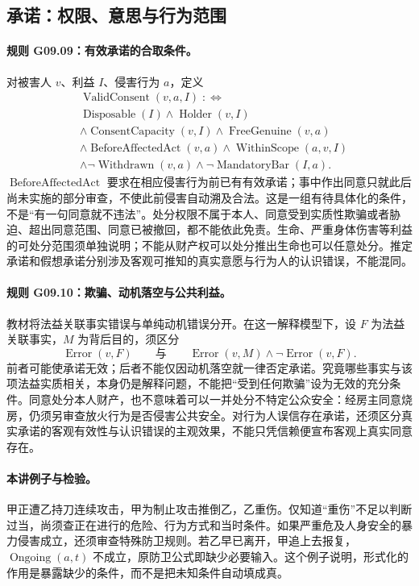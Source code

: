 \subsection{承诺：权限、意思与行为范围}
\paragraph{规则 G09.09：有效承诺的合取条件。}
对被害人 $v$、利益 $I$、侵害行为 $a$，定义
\[
\begin{aligned}
&\operatorname{ValidConsent}(v,a,I)\;:\!\!\iff\\
&\operatorname{Disposable}(I)\land\operatorname{Holder}(v,I)\\
&\land\operatorname{ConsentCapacity}(v,I)
\land\operatorname{FreeGenuine}(v,a)\\
&\land\operatorname{BeforeAffectedAct}(v,a)
\land\operatorname{WithinScope}(a,v,I)\\
&\land\neg\operatorname{Withdrawn}(v,a)
\land\neg\operatorname{MandatoryBar}(I,a).
\end{aligned}
\]
$\operatorname{BeforeAffectedAct}$ 要求在相应侵害行为前已有有效承诺；事中作出同意只就此后尚未实施的部分审查，不使此前侵害自动溯及合法。这是一组有待具体化的条件，不是“有一句同意就不违法”。处分权限不属于本人、同意受到实质性欺骗或者胁迫、超出同意范围、同意已被撤回，都不能依此免责。生命、严重身体伤害等利益的可处分范围须单独说明；不能从财产权可以处分推出生命也可以任意处分。推定承诺和假想承诺分别涉及客观可推知的真实意愿与行为人的认识错误，不能混同。

\paragraph{规则 G09.10：欺骗、动机落空与公共利益。}
教材将法益关联事实错误与单纯动机错误分开。在这一解释模型下，设 $F$ 为法益关联事实，$M$ 为背后目的，须区分
\[
\operatorname{Error}(v,F)\qquad\text{与}\qquad
\operatorname{Error}(v,M)\land\neg\operatorname{Error}(v,F).
\]
前者可能使承诺无效；后者不能仅因动机落空就一律否定承诺。究竟哪些事实与该项法益实质相关，本身仍是解释问题，不能把“受到任何欺骗”设为无效的充分条件。同意处分本人财产，也不意味着可以一并处分不特定公众安全：经房主同意烧房，仍须另审查放火行为是否侵害公共安全。对行为人误信存在承诺，还须区分真实承诺的客观有效性与认识错误的主观效果，不能只凭信赖便宣布客观上真实同意存在。

\paragraph{本讲例子与检验。}
甲正遭乙持刀连续攻击，甲为制止攻击推倒乙，乙重伤。仅知道“重伤”不足以判断过当，尚须查正在进行的危险、行为方式和当时条件。如果严重危及人身安全的暴力侵害成立，还须审查特殊防卫规则。若乙早已离开，甲追上去报复，$\operatorname{Ongoing}(a,t)$ 不成立，原防卫公式即缺少必要输入。这个例子说明，形式化的作用是暴露缺少的条件，而不是把未知条件自动填成真。

